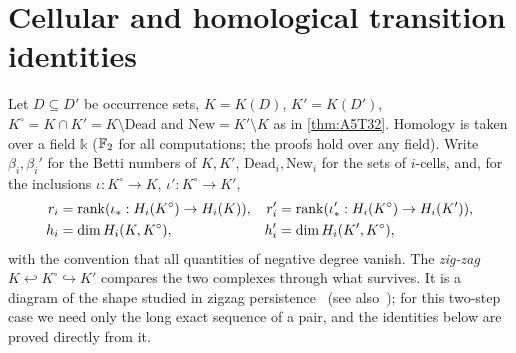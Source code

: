 \section{Cellular and homological transition identities}\label{sec:homology}
Let $D\subseteq D'$ be occurrence sets, $K=K(D)$, $K'=K(D')$, $K^\circ=K\cap K'=K\setminus\mathrm{Dead}$ and $\mathrm{New}=K'\setminus K$ as in \cref{thm:A5T32}. Homology is taken over a field $\mathbb k$ ($\mathbb F_2$ for all computations; the proofs hold over any field). Write $\beta_i,\beta_i'$ for the Betti numbers of $K,K'$, $\mathrm{Dead}_i,\mathrm{New}_i$ for the sets of $i$-cells, and, for the inclusions $\iota:K^\circ\to K$, $\iota':K^\circ\to K'$,
\[
\begin{aligned}r_i&=\operatorname{rank}(\iota_*:H_i(K^\circ)\to H_i(K)),& r_i'&=\operatorname{rank}(\iota'_*:H_i(K^\circ)\to H_i(K')),\\ h_i&=\dim H_i(K,K^\circ),& h_i'&=\dim H_i(K',K^\circ),\end{aligned}
\]
with the convention that all quantities of negative degree vanish. The \emph{zig-zag} $K\hookleftarrow K^\circ\hookrightarrow K'$ compares the two complexes through what survives. It is a diagram of the shape studied in zigzag persistence~\cite{CarlssonDeSilva2010} (see also~\cite{CarlssonZomorodian2009}); for this two-step case we need only the long exact sequence of a pair, and the identities below are proved directly from it.


